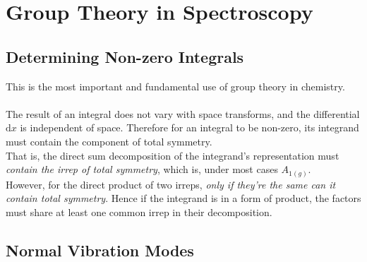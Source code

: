 \section{Group Theory in Spectroscopy}

	\subsection{Determining Non-zero Integrals}
	
		This is the most important and fundamental use of group theory in chemistry.\\\ \\
		The result of an integral does not vary with space transforms, and the differential $\text{d}x$ is independent of space. 
		Therefore for an integral to be non-zero, its integrand must contain the component of total symmetry. \\
		That is, the direct sum decomposition of the integrand's representation must \emph{contain the irrep of total symmetry}, 
		which is, under most cases $A_{1(g)}$.\\
		However, for the direct product of two irreps, \emph{only if they're the same can it contain total symmetry}.	
		Hence if the integrand is in a form of product, the factors must share at least one common irrep in their decomposition.\label{8.3.1}

	\subsection{Normal Vibration Modes}
	
